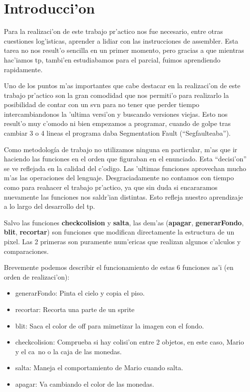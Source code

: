 \section{Introducci'on}

	Para la realizaci'on de este trabajo pr'actico nos fue necesario, entre
otras cuestiones log'isticas, aprender a lidiar con las instrucciones de assembler.
Esta tarea no nos result'o sencilla en un primer momento, pero gracias a que
mientras hac'iamos tp, tambi'en estudiabamos para el parcial, fuimos aprendiendo
rapidamente.

	Uno de los puntos m'as importantes que cabe destacar en la
realizaci'on de este trabajo pr'actico son la gran comodidad que nos permiti'o
para realizarlo la posibilidad de contar con un svn para no tener que perder
tiempo intercambiandonos la 'ultima versi'on y buscando versiones viejas. Esto
nos result'o muy c'omodo ni bien empezamos a programar, cuando de golpe tras
cambiar 3 o 4 lineas el programa daba Segmentation Fault (``Segfaulteaba'').

	Como metodología de trabajo no utilizamos ninguna en particular, m'as que
ir haciendo las funciones en el orden que figuraban en el enunciado. Esta
``decisi'on'' se ve reflejada en la calidad del c'odigo. Las 'ultimas funciones
aprovechan mucho m'as las operaciones del lenguaje. Desgraciadamente no
contamos con tiempo como para reahacer el trabajo pr'actico, ya que sin duda si
encararamos nuevamente las funciones nos saldr'ian distintas. Esto refleja
nuestro aprendizaje a lo largo del desarrollo del tp.

	Salvo las funciones \textbf{checkcolision} y \textbf{salta}, las dem'as
(\textbf{apagar}, \textbf{generarFondo}, \textbf{blit}, \textbf{recortar}) son
funciones que modifican directamente la estructura de un pixel. Las 2 primeras
son puramente num'ericas que realizan algunos c'alculos y comparaciones.

	Brevemente podemos describir el funcionamiento de estas 6 funciones as'i
(en orden de realizaci'on):

\begin{itemize}
	\item generarFondo: Pinta el cielo y copia el piso.
	\item recortar: Recorta una parte de un sprite
	\item blit: Saca el color de off para mimetizar la imagen con el fondo.
	\item checkcolision: Comprueba si hay colisi'on entre 2 objetos, en este
caso, Mario y el ca~no o la caja de las monedas.
	\item salta: Maneja el comportamiento de Mario cuando salta.
	\item apagar: Va cambiando el color de las monedas.
\end{itemize}

